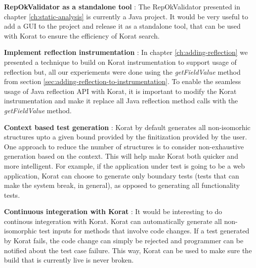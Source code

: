
\para
\textbf{RepOkValidator as a standalone tool} : The RepOkValidator presented in chapter \ref{ch:static-analysis} is currently a Java project. It would be very useful to add a GUI to the project and release it as a standalone tool, that can be used with Korat to ensure the efficiency of Korat search.

\para
\textbf{Implement reflection instrumentation} : In chapter \ref{ch:adding-reflection} we presented a technique to build on Korat instrumentation to support usage of reflection but, all our experiements were done using the \emph{getFieldValue} method from section \ref{sec:adding-reflection-to-instrumentation}. To enable the seamless usage of Java reflection API with Korat, it is important to modify the Korat instrumentation and make it replace all Java reflection method calls with the \emph{getFieldValue} method.

\para
\textbf{Context based test generation} : Korat by default generates all non-isomorhic structures upto a given bound provided by the finitization provided by the user. One approach to reduce the number of structures is to consider non-exhaustive generation based on the context. This will help make Korat both quicker and more intelligent. For example, if the application under test is going to be a web application, Korat can choose to generate only boundary tests (tests that can make the system break, in general), as opposed to generating all functionality tests.

\para
\textbf{Continuous integeration with Korat} : It would be interesting to do continous integeration \cite{fowler2006continuous} with Korat. Korat can automatically generate all non-isomorphic test inputs for methods that involve code changes. If a test generated by Korat fails, the code change can simply be rejected and programmer can be notified about the test case failure. This way, Korat can be used to make sure the build that is currently live is never broken.





